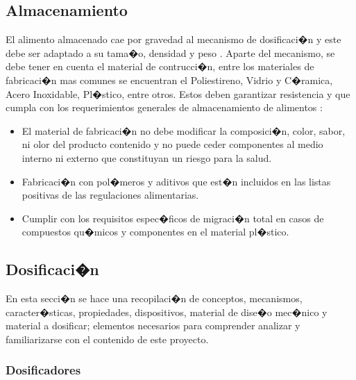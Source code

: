 	
\subsection{Almacenamiento}
El alimento almacenado cae por gravedad al mecanismo de dosificaci�n y este debe ser adaptado a su tama�o, densidad y peso \cite{pinturan}. Aparte del mecanismo, se debe tener en cuenta el material de contrucci�n, entre los materiales de fabricaci�n mas comunes se encuentran el Poliestireno, Vidrio  y C�ramica, Acero Inoxidable, Pl�stico,  entre otros. Estos deben garantizar resistencia y que cumpla con los requerimientos generales de almacenamiento de alimentos \cite{casti}:
\begin{itemize}
	\item El material de fabricaci�n no debe modificar la composici�n, color, sabor, ni olor del producto contenido y no puede ceder componentes al medio interno ni externo que constituyan un riesgo para la salud.
	\item Fabricaci�n con pol�meros y aditivos que est�n incluidos en las listas positivas de las regulaciones alimentarias.
	\item Cumplir con los requisitos espec�ficos de migraci�n total en casos de compuestos qu�micos y componentes en el material pl�stico.
\end{itemize}


\subsection{Dosificaci�n}
En esta secci�n se hace una recopilaci�n de  conceptos, mecanismos, caracter�sticas, propiedades, dispositivos, material de dise�o mec�nico y material a dosificar; elementos necesarios para comprender analizar y familiarizarse con el contenido de este proyecto.

\subsubsection{Dosificadores}


